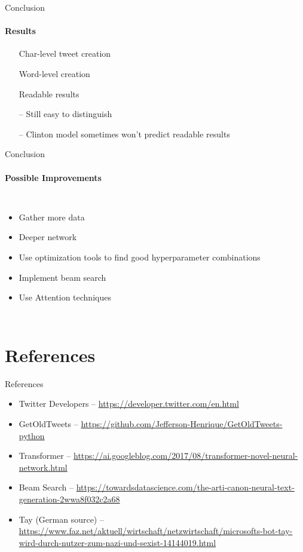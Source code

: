 \documentclass{beamer}
\begin{document}
\begin{frame}{Conclusion}
\framesubtitle{Results}
\begin{itemize}
\item[\color{th_red}\checkmark] Char-level tweet creation
\item[\color{th_red}\checkmark] Word-level creation
\item[\color{th_red}\checkmark] Readable results
\vspace{4mm}
\item[\color{th_red}--] Still easy to distinguish
\item[\color{th_red}--] Clinton model sometimes won't predict readable results
\end{itemize}
\end{frame}

\begin{frame}{Conclusion}
\framesubtitle{Possible Improvements}
\begin{columns}
\begin{itemize}
\itemsep1em
\item Gather more data
\item Deeper network
\item Use optimization tools to find good hyperparameter combinations
\item Implement beam search
\item Use Attention techniques
\end{itemize}

\end{columns}
\end{frame}

\section{References}

\begin{frame}{References}
\begin{small}
\begin{itemize}
\item Twitter Developers -- \url{https://developer.twitter.com/en.html}
\item GetOldTweets -- \url{https://github.com/Jefferson-Henrique/GetOldTweets-python}
\item Transformer -- \url{https://ai.googleblog.com/2017/08/transformer-novel-neural-network.html}
\item Beam Search -- \url{https://towardsdatascience.com/the-arti-canon-neural-text-generation-2wwa8f032c2a68}
\item Tay (German source) -- \url{https://www.faz.net/aktuell/wirtschaft/netzwirtschaft/microsofts-bot-tay-wird-durch-nutzer-zum-nazi-und-sexist-14144019.html}
\end{itemize}
\end{small}
\end{frame}
\end{document}
